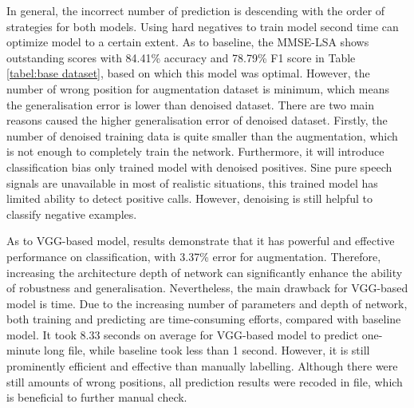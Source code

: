 In general, the incorrect number of prediction is descending with the order of strategies for both models. Using hard negatives to train model second time can optimize model to a certain extent. As to baseline, the MMSE-LSA shows outstanding scores with 84.41\% accuracy and 78.79\% F1 score in Table \ref{tabel:base dataset}, based on which this model was optimal. However, the number of wrong position for augmentation dataset is minimum, which means the generalisation error is lower than denoised dataset. There are two main reasons caused the higher generalisation error of denoised dataset. Firstly, the number of denoised training data is quite smaller than the augmentation, which is not enough to completely train the network. Furthermore, it will introduce classification bias only trained model with denoised positives. Sine pure speech signals are unavailable in most of realistic situations, this trained model has limited ability to detect positive calls. However, denoising is still helpful to classify negative examples.

As to VGG-based model, results demonstrate that it has powerful and effective performance on classification, with 3.37\% error for augmentation. Therefore, increasing the architecture depth of network can significantly enhance the ability of robustness and generalisation. Nevertheless, the main drawback for VGG-based model is time. Due to the increasing number of parameters and depth of network, both training and predicting are time-consuming efforts, compared with baseline model. It took 8.33 seconds on average for VGG-based model to predict one-minute long file, while baseline took less than 1 second.
However, it is still prominently efficient and effective than manually labelling. Although there were still amounts of wrong positions, all prediction results were recoded in file, which is beneficial to further manual check.
